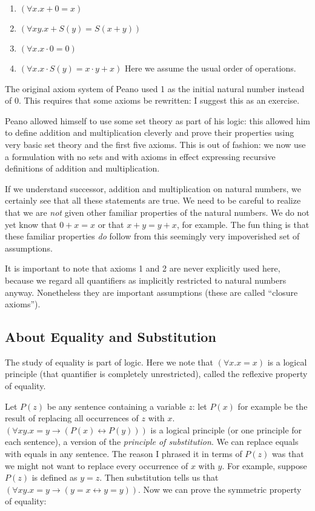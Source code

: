 \documentclass[12pt]{article}
\begin{document}
\begin{enumerate}
\item $(\forall x.x+0=x)$

\item $(\forall xy.x+S(y)=S(x+y))$

\item $(\forall x.x\cdot 0 = 0)$

\item $(\forall x.x \cdot S(y) = x\cdot y +x)$  Here we assume the usual order of operations.

\end{enumerate}

The original axiom system of Peano used 1 as the initial natural
number instead of 0.  This requires that some axioms be rewritten: I
suggest this as an exercise.

Peano allowed himself to use some set theory as part of his logic:
this allowed him to define addition and multiplication cleverly and
prove their properties using very basic set theory and the first five
axioms.  This is out of fashion: we now use a formulation with no sets
and with axioms in effect expressing recursive definitions of addition
and multiplication.

If we understand successor, addition and multiplication on natural
numbers, we certainly see that all these statements are true.  We need
to be careful to realize that we are {\em not\/} given other familiar
properties of the natural numbers.  We do not yet know that $0+x=x$ or
that $x+y=y+x$, for example.  The fun thing is that these familiar
properties {\em do\/} follow from this seemingly very impoverished set
of assumptions.

It is important to note that axioms 1 and 2 are never explicitly used
here, because we regard all quantifiers as implicitly restricted to
natural numbers anyway.  Nonetheless they are important assumptions
(these are called ``closure axioms'').

\subsection{About Equality and Substitution}

The study of equality is part of logic.  Here we note that $(\forall
x.x=x)$ is a logical principle (that quantifier is completely
unrestricted), called the reflexive property of equality.

Let $P(z)$ be any sentence containing a variable $z$: let $P(x)$ for
example be the result of replacing all occurrences of $z$ with $x$.
$(\forall xy.x=y \rightarrow (P(x) \leftrightarrow P(y)))$ is a logical
principle (or one principle for each sentence), a version of the {\em
principle of substitution\/}.  We can replace equals with equals in
any sentence.  The reason I phrased it in terms of $P(z)$ was that we might not want to replace every occurrence of $x$ with $y$.  For example, suppose
$P(z)$ is defined as $y=z$.  Then substitution tells us that $(\forall xy.x=y \rightarrow (y=x \leftrightarrow y=y))$.  Now we can prove the symmetric property of equality:
\end{document}
